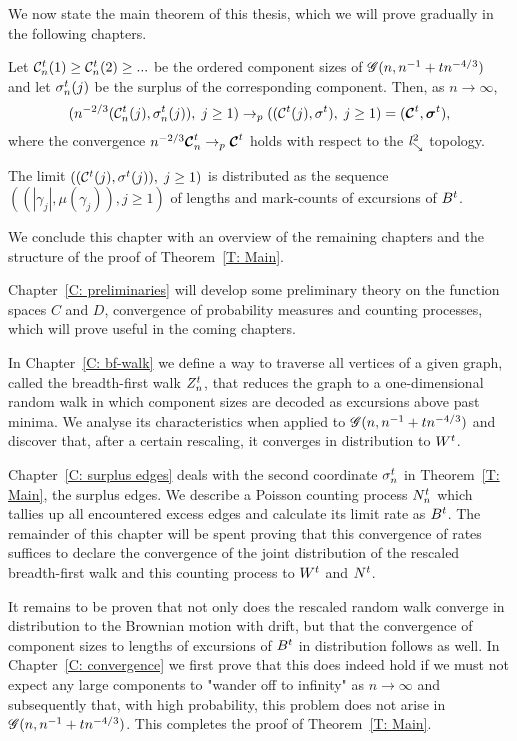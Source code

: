 We now state the main theorem of this thesis, which we will prove gradually in the following chapters.
\begin{theorem} \label{T: Main}
	Let 
	$\mathcal{C}^t_n(1) \geq \mathcal{C}^t_n(2) \geq ... $ 
	be the ordered component sizes of 
	$\mathscr{G}(n, n^{-1} + tn^{-4/3})$
	and let
	$\mathcal{\sigma}^t_n(j)$ 
	be the surplus of the corresponding component.
	Then, as $n \rightarrow \infty$,
	\begin{equation}
	( n^{-2 / 3} ( \mathcal{C}^t_n(j), \mathcal{\sigma}^t_n(j) ), \; j \geq 1 ) 
	\rightarrow_p
	( (\mathcal{C}^t(j), \mathcal{\sigma}^t), \; j \geq 1 )
	= ( \boldsymbol{\mathcal{C}}^t, \boldsymbol{\mathcal{\sigma}}^t ),
	\end{equation}
	where the convergence 
	$n^{-2 / 3} \boldsymbol{\mathcal{C}}^t_n \rightarrow_p \boldsymbol{\mathcal{C}}^t$
	holds with respect to the $\mathit{l}^2_{\searrow}$ topology.
	
	The limit
	$\left( ( \mathcal{C}^t(j), \mathcal{\sigma}^t(j) ), \; j \geq 1 \right)$
	is distributed as the sequence
	$ \left( (|\gamma_j|, \mu(\gamma_j)), j \geq 1  \right) $
	of lengths and mark-counts of excursions of $B^t$.
\end{theorem}

We conclude this chapter with an overview of the remaining chapters and the structure of the proof of Theorem~\ref{T: Main}.

Chapter~\ref{C: preliminaries} will develop some preliminary theory on the function spaces $C$ and $D$,
convergence of probability measures and counting processes, which will prove useful in the coming chapters.

In Chapter~\ref{C: bf-walk} we define a way to traverse all vertices of a given graph, called the breadth-first walk $Z_n^t$, 
that reduces the graph to a one-dimensional random walk in which component sizes are decoded as excursions above past minima.
We analyse its characteristics when applied to $\mathscr{G}(n, n^{-1} + tn^{-4/3})$ and discover that, after a certain rescaling, it converges in distribution to $W^t$.

Chapter~\ref{C: surplus edges} deals with the second coordinate $\mathcal{\sigma}^t_n$ in Theorem~\ref{T: Main}, the surplus edges.
We describe a Poisson counting process $N_n^t$ which tallies up all encountered excess edges and calculate its limit rate as $B^t$.
The remainder of this chapter will be spent proving that this convergence of rates suffices to declare the convergence of the joint distribution of
the rescaled breadth-first walk and this counting process to $W^t$ and $N^t$.

It remains to be proven that not only does the rescaled random walk converge in distribution to the Brownian motion with drift,
but that the convergence of component sizes to lengths of excursions of $B^t$ in distribution follows as well.
In Chapter~\ref{C: convergence} we first prove that this does indeed hold if we must not expect any large components to "wander off to infinity" as $n \rightarrow \infty$ and subsequently that, with high probability, this problem does not arise in $\mathscr{G}(n, n^{-1} + tn^{-4/3})$.
This completes the proof of Theorem~\ref{T: Main}.

